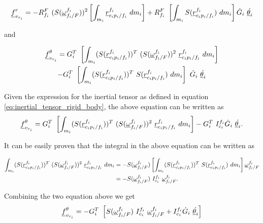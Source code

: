 \begin{equation}
    \vecd{f}^{r}_{v_{r_i}} = -\rot{R}{f_{i}}{F}\ (S(\pvec{\omega}{f_{i}}{F}{f_i}))^{2}
    \left[\int_{m_i} \pvec{r}{c_{i}p_{i}}{f_i}{f_i}\ dm_{i}\right]
    + \rot{R}{f_{i}}{F}\ \left[\int_{m_i} S(\pvec{r}{c_{i}p_{i}}{f_i}{f_i})\ dm_{i}\right] 
    \dot{G}_{i} \ \dot{\vecd{\theta}_{i}}
    \label{eq:coriolis_forces_rigid_body_r_component} 
\end{equation}

and 

\begin{multline*}
    \vecd{f}^{\theta}_{v_{r_i}} = G^{T}_{i}\ \left[\int_{m_i}(S(\pvec{r}{c_{i}p_{i}}{f_i}{f_i}))^{T}\ 
    (S(\pvec{\omega}{f_{i}}{F}{f_i}))^{2}\ \pvec{r}{c_{i}p_{i}}{f_i}{f_i}\ dm_{i} \right] \\
    - G^{T}_{i}\ \left[\int_{m_i}(S(\pvec{r}{c_{i}p_{i}}{f_i}{f_i}))^{T}\ 
    S(\pvec{r}{c_{i}p_{i}}{f_i}{f_i})\ dm_{i}\right]\ \dot{G}_{i} \ \dot{\vecd{\theta}_{i}}
\end{multline*}

Given the expression for the inertial tensor as defined in equation 
\eqref{eq:inertial_tensor_rigid_body}, the above equation can be written as 
\[
    \vecd{f}^{\theta}_{v_{r_i}} = G^{T}_{i}\ \left[\int_{m_i}(S(\pvec{r}{c_{i}p_{i}}{f_i}{f_i}))^{T}\ 
    (S(\pvec{\omega}{f_{i}}{F}{f_i}))^{2}\ \pvec{r}{c_{i}p_{i}}{f_i}{f_i}\ dm_{i} \right] 
    - G^{T}_{i}\ I^{f_i}_{c_i} \dot{G}_{i} \ \dot{\vecd{\theta}_{i}}.
\]

It can be easily proven that the integral in the above equation can be written as 

\begin{align*}
    \int_{m_i}(S(\pvec{r}{c_{i}p_{i}}{f_i}{f_i}))^{T}\ 
    (S(\pvec{\omega}{f_{i}}{F}{f_i}))^{2}\ \pvec{r}{c_{i}p_{i}}{f_i}{f_i}\ dm_{i} 
    & = - S(\pvec{\omega}{f_{i}}{F}{f_i}) \left[\int_{m_i}(S(\pvec{r}{c_{i}p_{i}}{f_i}{f_i}))^{T}\ 
    S(\pvec{r}{c_{i}p_{i}}{f_i}{f_i})\ dm_{i}\right] \pvec{\omega}{f_{i}}{F}{f_i} \\ 
    & = - S(\pvec{\omega}{f_{i}}{F}{f_i})\ I^{f_i}_{c_i}\  \pvec{\omega}{f_{i}}{F}{f_i}.
\end{align*}

Combining the two equation above we get 
\begin{equation}
    \vecd{f}^{\theta}_{v_{r_i}} = - G^{T}_{i}\ \left[ 
    S(\pvec{\omega}{f_{i}}{F}{f_i})\ I^{f_i}_{c_i}\ \pvec{\omega}{f_{i}}{F}{f_i}
    + I^{f_i}_{c_i} \dot{G}_{i} \ \dot{\vecd{\theta}_{i}}  
    \right]
\end{equation}

